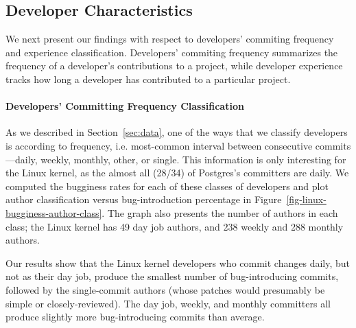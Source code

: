 

\subsection{Developer Characteristics}
We next present our findings with respect to developers' commiting 
frequency and experience classification. Developers'
commiting frequency summarizes the frequency of
a developer's contributions to a project, while developer experience
tracks how long a developer has contributed to a particular project.

\paragraph{Developers' Committing Frequency Classification} 
As we described in Section~\ref{sec:data}, one of the ways that we
classify developers is according to frequency, i.e. most-common
interval between consecutive commits---daily, weekly, monthly, other,
or single.  This information is only interesting for the Linux kernel, as the
almost all (28/34) of Postgres's committers are daily. We computed the
bugginess rates for each of these classes of developers and plot
author classification versus bug-introduction percentage in
Figure~\ref{fig-linux-bugginess-author-class}. The graph also presents
the number of authors in each class; the Linux kernel has 49 day job authors,
and 238 weekly and 288 monthly authors.

Our results show that the Linux kernel developers who commit changes daily, but
not as their day job, produce the smallest number of bug-introducing
commits, followed by the single-commit authors (whose patches would
presumably be simple or closely-reviewed). The day job, weekly, and
monthly committers all produce slightly more bug-introducing commits
than average.

